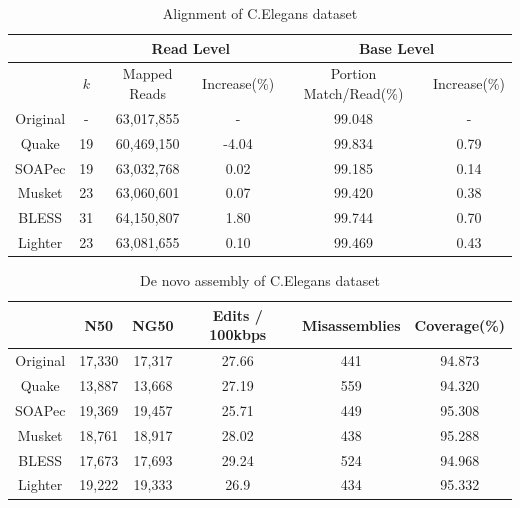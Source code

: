 \documentclass{bmcart}
\begin{document}
\begin{backmatter}
\begin{table}[h!]%
\caption{Alignment of C.Elegans dataset}
\begin{tabular}{|c|c|c|c||c|c|}\hline
  & & \multicolumn{2}{|c||}{Read Level} & \multicolumn{2}{|c|}{Base Level} \\ \hline
  &	$k$ & Mapped Reads  &Increase(\%) & Portion Match/Read(\%) & Increase(\%) \\ \hline
Original & - & 63,017,855	& - 	&	99.048 & - \\ \hline
Quake 	& 19 & 60,469,150	& -4.04	&	99.834 & 0.79 \\ \hline
SOAPec  & 19 & 63,032,768    & 0.02	& 	99.185 & 0.14 \\ \hline
Musket 	& 23 &	63,060,601	&	0.07 &	99.420 & 0.38 \\ \hline
BLESS 	& 31 & 64,150,807	& 1.80 &  99.744   & 0.70 \\ \hline
Lighter	& 23 & 63,081,655	& 0.10	& 99.469   & 0.43 \\ \hline
\end{tabular}
\end{table}

\begin{table}[h!] %
\caption{De novo assembly of C.Elegans dataset}
\begin{tabular}{|c|c|c|c|c|c|} \hline
	   & N50 &	NG50	& Edits / 100kbps &	Misassemblies	& Coverage(\%) \\ \hline
Original &	17,330	& 17,317	& 27.66	& 441& 	94.873 \\ \hline
Quake	&	13,887	& 13,668	& 27.19	& 559	& 94.320 \\ \hline
SOAPec  & 19,369	& 19,457	& 25.71	& 449	& 95.308 \\ \hline
Musket	&	18,761	& 18,917	& 28.02	& 438	& 95.288 \\ \hline
BLESS	&	17,673	& 17,693	& 29.24	& 524	& 94.968 \\ \hline
Lighter	&	19,222	& 19,333	& 26.9	& 434	& 95.332 \\ \hline
\end{tabular}
\end{table}


\end{backmatter}
\end{document}
